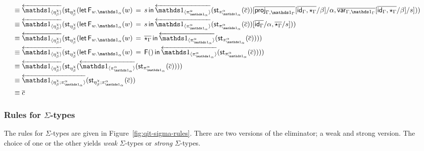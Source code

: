 \documentclass[10pt]{article}
\theoremstyle{definition}
\newcommand{\id}{\mathsf{id}}
\newcommand{\rewrite}[2]{\overleftarrow{#1}(#2)}
\newcommand\StI[2]{\ensuremath{\mathsf{st}_{#1}(#2)}}
\newcommand\FEs[4]{\ensuremath{\mathsf{let} \, \mathsf{F}_{#1}(#3) \, = \, {#2} \, \mathsf{in} \, #4}}
\newcommand\FI[1]{\ensuremath{\mathsf{F}{(#1)}}}
\begin{document}
\begin{enumerate}[style = multiline, labelwidth = 80pt]
\begin{align*}
&\equiv \rewrite{\ApOne{\eta^\chi_\beta}}{\StI{\eta^\chi_\beta}{\FEs{w.\One_\alpha}{s}{w}{\rewrite{\ApOne{\pi^\alpha_{\One_\alpha}}}{\StI{\pi^\alpha_{\One_\alpha}}{\upstairs{c}}}}[\upstairs{\proj{\Gamma, \One_\Gamma}}[\upstairs{\id_\Gamma, \star_\Gamma}/\beta]/\alpha, \upstairs{\qvar{\Gamma, \One_\Gamma}}[\upstairs{\id_\Gamma, \star_\Gamma}/\beta]/s]}} \\
&\equiv \rewrite{\ApOne{\eta^\chi_\beta}}{\StI{\eta^\chi_\beta}{\FEs{w.\One_\alpha}{s}{w}{\rewrite{\ApOne{\pi^\alpha_{\One_\alpha}}}{\StI{\pi^\alpha_{\One_\alpha}}{\upstairs{c}}}}[\upstairs{\id_\Gamma}/\alpha, \upstairs{\star_\Gamma}/s]}} \\
&\equiv \rewrite{\ApOne{\eta^\chi_\beta}}{\StI{\eta^\chi_\beta}{\FEs{w.\One_\alpha}{\upstairs{\star_\Gamma}}{w}{\rewrite{\ApOne{\pi^\alpha_{\One_\alpha}}}{\StI{\pi^\alpha_{\One_\alpha}}{\upstairs{c}}}}}} \\
&\equiv \rewrite{\ApOne{\eta^\chi_\beta}}{\StI{\eta^\chi_\beta}{\FEs{w.\One_\alpha}{\FI{}}{w}{\rewrite{\ApOne{\pi^\alpha_{\One_\alpha}}}{\StI{\pi^\alpha_{\One_\alpha}}{\upstairs{c}}}}}} \\
&\equiv \rewrite{\ApOne{\eta^\chi_\beta}}{\StI{\eta^\chi_\beta}{\rewrite{\ApOne{\pi^\alpha_{\One_\alpha}}}{\StI{\pi^\alpha_{\One_\alpha}}{\upstairs{c}}}}} \\
&\equiv \rewrite{\ApOne{\eta^\chi_\beta;\pi^\alpha_{\One_\alpha}}}{\StI{\eta^\chi_\beta;\pi^\alpha_{\One_\alpha}}{\upstairs{c}}} \\
&\equiv \upstairs{c}
\end{align*}
\end{enumerate}

\subsubsection{Rules for $\Sigma$-types}
\newcommand\qpair[1]{\ensuremath{\mathsf{pair}_{#1}}}
\newcommand\qsplit[1]{\ensuremath{\mathsf{split}_{#1}}}

The rules for $\Sigma$-types are given in Figure~\ref{fig:qit-sigma-rules}. There are two versions of the eliminator; a weak and strong version. The choice of one or the other yields \emph{weak} $\Sigma$-types or \emph{strong} $\Sigma$-types.
\end{document}

